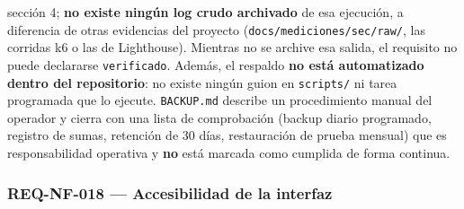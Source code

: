 \documentclass[
  spanish,
]{article}
\begin{document}
\begin{itemize}
  sección 4; \textbf{no existe ningún log crudo archivado} de esa
  ejecución, a diferencia de otras evidencias del proyecto
  (\texttt{docs/\allowbreak{}mediciones/\allowbreak{}sec/\allowbreak{}raw/}, las corridas k6 o las de
  Lighthouse). Mientras no se archive esa salida, el requisito no puede
  declararse \texttt{verificado}. Además, el respaldo \textbf{no está
  automatizado dentro del repositorio}: no existe ningún guion en
  \texttt{scripts/} ni tarea programada que lo ejecute.
  \texttt{BACKUP.\allowbreak{}md} describe un procedimiento manual del operador y
  cierra con una lista de comprobación (backup diario programado,
  registro de sumas, retención de 30 días, restauración de prueba
  mensual) que es responsabilidad operativa y \textbf{no} está marcada
  como cumplida de forma continua.
\end{itemize}

\subsubsection{REQ-NF-018 --- Accesibilidad de la
interfaz}\label{req-nf-018-accesibilidad-de-la-interfaz}
\end{document}
